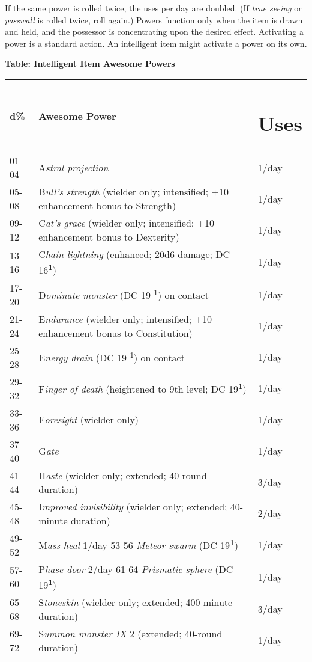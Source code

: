 \documentclass{article}
\begin{document}
\vspace{12pt}
If the same power is rolled twice, the uses per day are doubled. (If \textit{true 
seeing }or \textit{passwall }is rolled twice, roll again.) Powers function only 
when the item is drawn and held, and the possessor is concentrating upon the desired 
effect. Activating a power is a standard action. An intelligent item might activate 
a power on its own. 

\vspace{12pt}
\textbf{Table: Intelligent Item Awesome Powers }

\begin{tabular}{|>{\raggedright}p{30pt}|>{\raggedright}p{254pt}|>{\raggedright}p{29pt}|}
\hline
d\textbf{\%} & A\textbf{wesome Power } & \section*{U\textbf{ses }}\tabularnewline
\hline
01-04 & A\textit{stral projection } & 1/day \tabularnewline
\hline
05-08 & B\textit{ull's strength }(wielder only; intensified; +10 enhancement bonus 
to Strength) & 1/day \tabularnewline
\hline
09-12 & C\textit{at's grace }(wielder only; intensified; +10 enhancement bonus 
to Dexterity) & 1/day \tabularnewline
\hline
13-16 & C\textit{hain lightning }(enhanced; 20d6 damage; DC 16\textsuperscript{\textbf{1}}) 
  & 1/day \tabularnewline
\hline
17-20 & D\textit{ominate monster }(DC 19 \textsuperscript{1}) on contact  & 1/day 
\tabularnewline
\hline
21-24 & E\textit{ndurance }(wielder only; intensified; +10 enhancement bonus to 
Constitution) & 1/day \tabularnewline
\hline
25-28 & E\textit{nergy drain }(DC 19 \textsuperscript{1}) on contact  & 1/day \tabularnewline
\hline
29-32 & F\textit{inger of death }(heightened to 9th level; DC 19\textsuperscript{\textbf{1}}) & 1/day 
\tabularnewline
\hline
33-36 & F\textit{oresight }(wielder only)  & 1/day \tabularnewline
\hline
37-40 & G\textit{ate } & 1/day \tabularnewline
\hline
41-44 & H\textit{aste }(wielder only; extended; 40-round duration)  & 3/day \tabularnewline
\hline
45-48 & I\textit{mproved invisibility }(wielder only; extended; 40-minute duration) & 2/day 
\tabularnewline
\hline
49-52 & M\textit{ass heal }1/day 53-56 \textit{Meteor swarm }(DC 19\textsuperscript{\textbf{1}}) 
 & 1/day \tabularnewline
\hline
57-60 & P\textit{hase door }2/day 61-64 \textit{Prismatic sphere }(DC 19\textsuperscript{\textbf{1}}) & 1/day 
\tabularnewline
\hline
65-68 & S\textit{toneskin }(wielder only; extended; 400-minute duration)  & 3/day 
\tabularnewline
\hline
69-72 & S\textit{ummon monster IX }2 (extended; 40-round duration) & 1/day \tabularnewline

\end{tabular}
\end{document}
